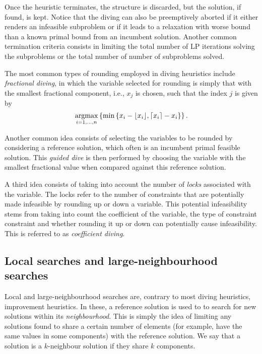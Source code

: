 Once the heuristic terminates, the structure is discarded, but the solution, if found, is kept. Notice that the diving  can also be preemptively aborted if it either renders an infeasible subproblem or if it leads to a relaxation with worse bound than a known primal bound from an incumbent solution. Another common termination criteria consists in limiting the total number of LP iterations solving the subproblems or the total number of number of subproblems solved. 

The most common types of rounding employed in diving heuristics include \emph{fractional diving}, in which the variable selected for rounding is simply that with the smallest fractional component, i.e., $x_j$ is chosen, such that the index $j$ is given by
%
\begin{equation*}
	\mathop{\rm argmax}_{i=1,\dots,n} \left\{ \min\left\{ x_i-\lfloor x_i\rfloor, \lceil x_i \rceil - x_i \right \} \right \}.	
\end{equation*}

Another common idea consists of selecting the variables to be rounded by considering a reference solution, which often is an incumbent primal feasible solution. This \emph{guided dive} is then performed by choosing the variable with the smallest fractional value when compared against this reference solution. 

A third idea consists of taking into account the number of \emph{locks} associated with the variable. The locks refer to the number of constraints that are potentially made infeasible by rounding up or down a variable. This potential infeasibility stems from taking into count the coefficient of the variable, the type of constraint constraint and whether rounding it up or down can potentially cause infeasibility. This is referred to as \emph{coefficient diving}.


\subsection{Local searches and large-neighbourhood searches}

Local and large-neighbourhood searches are, contrary to most diving heuristics, improvement heuristics. In these, a reference solution is used to to search for new solutions within its \emph{neighbourhood}. This is simply the idea of limiting any solutions found to share a certain number of elements (for example, have the same values in some components) with the reference solution. We say that a solution is a $k$-neighbour solution if they share $k$ components.

